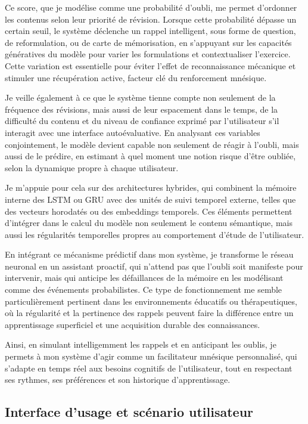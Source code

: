 \documentclass[11pt,a4paper]{report}
\begin{document}
Ce score, que je modélise comme une probabilité d’oubli, me permet d’ordonner les contenus selon leur priorité de révision. Lorsque cette probabilité dépasse un certain seuil, le système déclenche un rappel intelligent, sous forme de question, de reformulation, ou de carte de mémorisation, en s’appuyant sur les capacités génératives du modèle pour varier les formulations et contextualiser l’exercice. Cette variation est essentielle pour éviter l’effet de reconnaissance mécanique et stimuler une récupération active, facteur clé du renforcement mnésique.

Je veille également à ce que le système tienne compte non seulement de la fréquence des révisions, mais aussi de leur espacement dans le temps, de la difficulté du contenu et du niveau de confiance exprimé par l’utilisateur s’il interagit avec une interface autoévaluative. En analysant ces variables conjointement, le modèle devient capable non seulement de réagir à l’oubli, mais aussi de le prédire, en estimant à quel moment une notion risque d’être oubliée, selon la dynamique propre à chaque utilisateur.

Je m’appuie pour cela sur des architectures hybrides, qui combinent la mémoire interne des LSTM ou GRU avec des unités de suivi temporel externe, telles que des vecteurs horodatés ou des embeddings temporels. Ces éléments permettent d’intégrer dans le calcul du modèle non seulement le contenu sémantique, mais aussi les régularités temporelles propres au comportement d’étude de l’utilisateur.

En intégrant ce mécanisme prédictif dans mon système, je transforme le réseau neuronal en un assistant proactif, qui n’attend pas que l’oubli soit manifeste pour intervenir, mais qui anticipe les défaillances de la mémoire en les modélisant comme des événements probabilistes. Ce type de fonctionnement me semble particulièrement pertinent dans les environnements éducatifs ou thérapeutiques, où la régularité et la pertinence des rappels peuvent faire la différence entre un apprentissage superficiel et une acquisition durable des connaissances.

Ainsi, en simulant intelligemment les rappels et en anticipant les oublis, je permets à mon système d’agir comme un facilitateur mnésique personnalisé, qui s’adapte en temps réel aux besoins cognitifs de l’utilisateur, tout en respectant ses rythmes, ses préférences et son historique d’apprentissage.

\subsection{Interface d’usage et scénario utilisateur}
\end{document}
